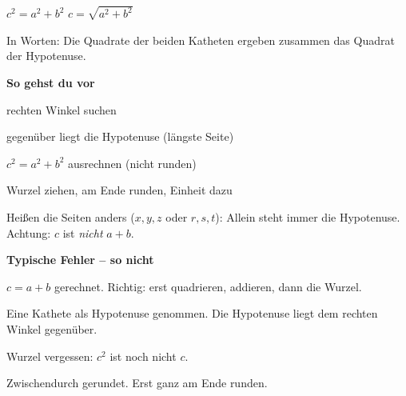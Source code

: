 \documentclass[11pt]{article}
\newcommand{\nr}[1]{\makebox[7mm][l]{\textbf{#1}}}
\begin{document}
\begin{tcolorbox}[colback=mbkasten,colframe=mbgrau,boxrule=0.5pt,arc=1mm,left=3mm,right=3mm,top=2mm,bottom=2mm,title={\bfseries Formel auf einen Blick},coltitle=black,colbacktitle=black!10]
\begin{minipage}[t]{0.58\linewidth}\vspace{0pt}
{\Large $c^2 = a^2 + b^2$ \qquad $c = \sqrt{a^2+b^2}$}\par\medskip
In Worten: Die Quadrate der beiden Katheten ergeben zusammen das Quadrat der Hypotenuse.\par\medskip
\textbf{So gehst du vor}\par
\nr{1}rechten Winkel suchen\par
\nr{2}gegenüber liegt die Hypotenuse (längste Seite)\par
\nr{3}$c^2 = a^2 + b^2$ ausrechnen (nicht runden)\par
\nr{4}Wurzel ziehen, am Ende runden, Einheit dazu\par\medskip
{\small Heißen die Seiten anders ($x,y,z$ oder $r,s,t$): Allein steht immer die Hypotenuse. Achtung: $c$ ist \emph{nicht} $a + b$.}
\end{minipage}\hfill
\begin{minipage}[t]{0.38\linewidth}\vspace{2mm}\centering
{}
\end{minipage}
\end{tcolorbox}
\medskip\noindent\textbf{Typische Fehler – so nicht}\par\smallskip
\noindent\nr{$\times$}$c = a + b$ gerechnet. Richtig: erst quadrieren, addieren, dann die Wurzel.\par
\noindent\nr{$\times$}Eine Kathete als Hypotenuse genommen. Die Hypotenuse liegt dem rechten Winkel gegenüber.\par
\noindent\nr{$\times$}Wurzel vergessen: $c^2$ ist noch nicht $c$.\par
\noindent\nr{$\times$}Zwischendurch gerundet. Erst ganz am Ende runden.\par
\end{document}
